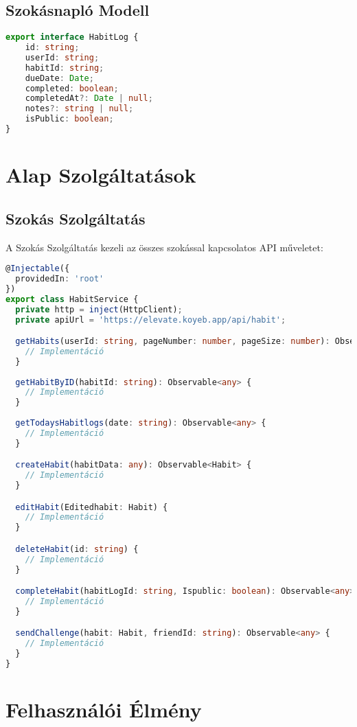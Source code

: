 \documentclass[12pt,a4paper]{report}
\begin{document}
\section{Szokásnapló Modell}
\begin{lstlisting}[language=typescript]
export interface HabitLog {
    id: string;
    userId: string;
    habitId: string;
    dueDate: Date;
    completed: boolean;
    completedAt?: Date | null;
    notes?: string | null;
    isPublic: boolean;
}
\end{lstlisting}

\chapter{Alap Szolgáltatások}

\section{Szokás Szolgáltatás}
A Szokás Szolgáltatás kezeli az összes szokással kapcsolatos API műveletet:

\begin{lstlisting}[language=typescript]
@Injectable({
  providedIn: 'root'
})
export class HabitService {
  private http = inject(HttpClient);
  private apiUrl = 'https://elevate.koyeb.app/api/habit';

  getHabits(userId: string, pageNumber: number, pageSize: number): Observable<Habit[]> {
    // Implementáció
  }
  
  getHabitByID(habitId: string): Observable<any> {
    // Implementáció
  }
  
  getTodaysHabitlogs(date: string): Observable<any> {
    // Implementáció
  }

  createHabit(habitData: any): Observable<Habit> {
    // Implementáció
  }

  editHabit(Editedhabit: Habit) {
    // Implementáció
  }

  deleteHabit(id: string) {
    // Implementáció
  }

  completeHabit(habitLogId: string, Ispublic: boolean): Observable<any> {
    // Implementáció
  }

  sendChallenge(habit: Habit, friendId: string): Observable<any> {
    // Implementáció
  }
}
\end{lstlisting}

\chapter{Felhasználói Élmény}
\end{document}
